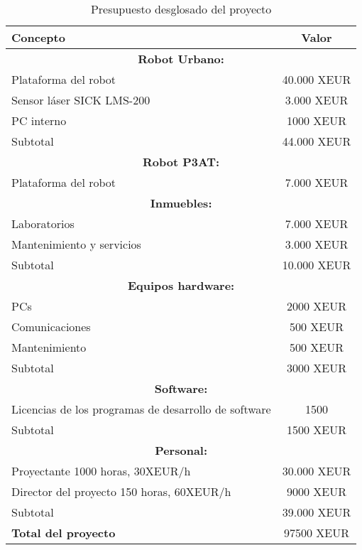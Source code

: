 \begin{table}[h]
\begin{center}
\begin{tabular}{|l|c|} \hline
Concepto & Valor\\
\hline
\multicolumn{2}{|c|}{\textbf{Robot Urbano:}}\\
\hline
Plataforma del robot & 40.000 XEUR \\
\hline
Sensor láser SICK LMS-200 & 3.000 XEUR \\
\hline
PC interno & 1000 XEUR \\
\hline
Subtotal & 44.000 XEUR \\
\hline
\multicolumn{2}{|c|}{\textbf{Robot P3AT:}}\\
\hline
Plataforma del robot & 7.000 XEUR \\
\hline
\multicolumn{2}{|c|}{\textbf{Inmuebles:}}\\
\hline
Laboratorios & 7.000 XEUR \\
\hline
Mantenimiento y servicios & 3.000 XEUR\\
\hline
Subtotal & 10.000 XEUR\\
\hline
\multicolumn{2}{|c|}{\textbf{Equipos hardware:}}\\
\hline
PCs & 2000 XEUR \\
\hline
Comunicaciones & 500 XEUR \\
\hline 
Mantenimiento & 500 XEUR \\
\hline
Subtotal & 3000 XEUR \\
\hline
\multicolumn{2}{|c|}{\textbf{Software:}}\\
\hline
Licencias de los programas de desarrollo de software & 1500\\
\hline
Subtotal & 1500 XEUR\\
\multicolumn{2}{|c|}{\textbf{Personal:}}\\
\hline
Proyectante 1000 horas, 30XEUR/h & 30.000 XEUR\\
\hline
Director del proyecto 150 horas, 60XEUR/h & 9000 XEUR\\
\hline
Subtotal & 39.000 XEUR\\
\hline
\hline
\textbf{Total del proyecto} & 97500 XEUR\\
\hline
\end {tabular}
\end{center}
\caption{Presupuesto desglosado del proyecto}
\end{table}


